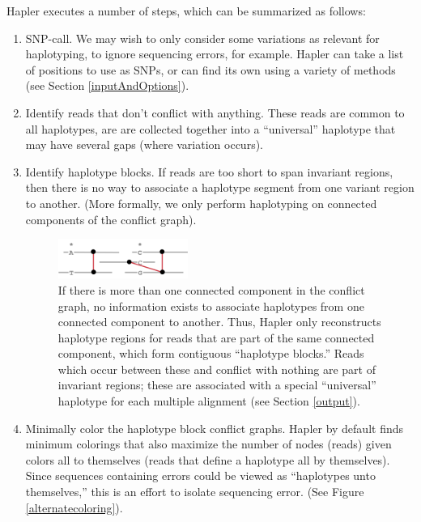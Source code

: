 \documentclass[11pt]{llncs}
\begin{document}


Hapler executes a number of steps, which can be summarized as follows:
\begin{enumerate}
	
	\item SNP-call. We may wish to only consider some variations as relevant for haplotyping, to ignore sequencing errors, for example. Hapler can 
	take a list of positions to use as SNPs, or can find its own using a variety of methods (see Section \ref{inputAndOptions}).
	
	\item Identify reads that don't conflict with anything. These reads are common to all haplotypes, are are collected together into a ``universal''
	haplotype that may have several gaps (where variation occurs).
	
	\item Identify haplotype blocks. If reads are too short to span invariant regions, then there is no way to associate a haplotype segment from
	one variant region to another. (More formally, we only perform haplotyping on connected components of the conflict graph).

\begin{figure}[!h]
\centering
   \includegraphics[width=0.4\textwidth]{graphics/haplotype_blocks}
   \caption{If there is more than one connected component in the conflict graph, no information exists to associate haplotypes from
   one connected component to another. Thus, Hapler only reconstructs haplotype regions for reads that are part of the same connected 
   component, which form contiguous ``haplotype blocks.'' Reads which occur between these and conflict with nothing are part of invariant
   regions; these are associated with a special ``universal'' haplotype for each multiple alignment (see Section \ref{output}).}
   \label{bicolor}
\end{figure}

	
	\item Minimally color the haplotype block conflict graphs. Hapler by default finds minimum colorings that also maximize the number of nodes 
	(reads) given colors all to themselves (reads that define a haplotype all by themselves). Since sequences containing errors could be viewed as 
	``haplotypes unto themselves,'' this is an effort to isolate sequencing error. (See Figure \ref{alternatecoloring}).	
	

\end{enumerate}
\end{document}
